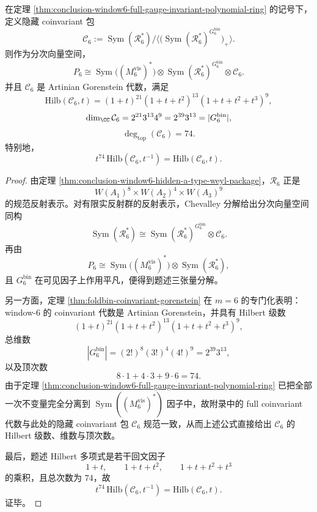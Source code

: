 \begin{theorem}\label{thm:conclusion-window6-hidden-coinvariant-gorenstein-package}
在定理 \ref{thm:conclusion-window6-full-gauge-invariant-polynomial-ring} 的记号下，定义隐藏 coinvariant 包
\[
\mathcal C_6
:=
\operatorname{Sym}(\mathscr R_6^\ast)\Big/\Big\langle
\bigl(\operatorname{Sym}(\mathscr R_6^\ast)^{G_6^{\mathrm{bin}}}\bigr)_+
\Big\rangle.
\]
则作为分次向量空间，
\[
P_6
\cong
\operatorname{Sym}\!\bigl((M_6^{\mathrm{vis}})^\ast\bigr)
\otimes
\operatorname{Sym}(\mathscr R_6^\ast)^{G_6^{\mathrm{bin}}}
\otimes
\mathcal C_6.
\]
并且 \(\mathcal C_6\) 是 Artinian Gorenstein 代数，满足
\[
\mathrm{Hilb}(\mathcal C_6,t)
=
(1+t)^{21}(1+t+t^2)^{13}(1+t+t^2+t^3)^9,
\]
\[
\dim_{\CC}\mathcal C_6
=
2^{21}3^{13}4^9
=
2^{39}3^{13}
=
|G_6^{\mathrm{bin}}|,
\]
\[
\deg_{\mathrm{top}}(\mathcal C_6)=74.
\]
特别地，
\[
t^{74}\,\mathrm{Hilb}(\mathcal C_6,t^{-1})
=
\mathrm{Hilb}(\mathcal C_6,t).
\]
\end{theorem}
\begin{proof}
由定理 \ref{thm:conclusion-window6-hidden-a-type-weyl-package}，\(\mathscr R_6\) 正是
\[
W(A_1)^{8}\times W(A_2)^{4}\times W(A_3)^{9}
\]
的规范反射表示。对有限实反射群的反射表示，Chevalley 分解给出分次向量空间同构
\[
\operatorname{Sym}(\mathscr R_6^\ast)
\cong
\operatorname{Sym}(\mathscr R_6^\ast)^{G_6^{\mathrm{bin}}}\otimes \mathcal C_6.
\]
再由
\[
P_6
\cong
\operatorname{Sym}\!\bigl((M_6^{\mathrm{vis}})^\ast\bigr)\otimes
\operatorname{Sym}(\mathscr R_6^\ast),
\]
且 \(G_6^{\mathrm{bin}}\) 在可见因子上作用平凡，便得到题述三张量分解。

另一方面，定理 \ref{thm:foldbin-coinvariant-gorenstein} 在 \(m=6\) 的专门化表明：window-\(6\) 的 coinvariant 代数是 Artinian Gorenstein，并具有 Hilbert 级数
\[
(1+t)^{21}(1+t+t^2)^{13}(1+t+t^2+t^3)^9,
\]
总维数
\[
|G_6^{\mathrm{bin}}|
=(2!)^8(3!)^4(4!)^9
=
2^{39}3^{13},
\]
以及顶次数
\[
8\cdot 1+4\cdot 3+9\cdot 6=74.
\]
由于定理 \ref{thm:conclusion-window6-full-gauge-invariant-polynomial-ring} 已把全部一次不变量完全分离到
\(\operatorname{Sym}((M_6^{\mathrm{vis}})^\ast)\) 因子中，故附录中的 full coinvariant 代数与此处的隐藏 coinvariant 包 \(\mathcal C_6\) 规范一致，从而上述公式直接给出 \(\mathcal C_6\) 的 Hilbert 级数、维数与顶次数。

最后，题述 Hilbert 多项式是若干回文因子
\[
1+t,\qquad 1+t+t^2,\qquad 1+t+t^2+t^3
\]
的乘积，且总次数为 \(74\)，故
\[
t^{74}\,\mathrm{Hilb}(\mathcal C_6,t^{-1})
=
\mathrm{Hilb}(\mathcal C_6,t).
\]
证毕。
\end{proof}

